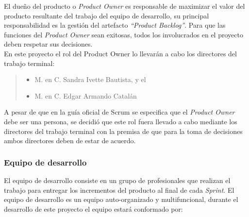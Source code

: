  El dueño del producto o {\em Product Owner} es responsable de maximizar el valor del producto
 resultante del trabajo del equipo de desarrollo, su principal responsabilidad es la gestión
 del artefacto {\em``Product Backlog''}. Para que las funciones del {\it Product Owner} sean exitosas,
 todos los involucrados en el proyecto deben respetar sus decisiones.\\

 \noindent En este proyecto el rol del Product Owner lo llevarán a cabo los directores del trabajo terminal:
     
    \begin{quote}
    \begin{itemize}
        \item M. en C. Sandra Ivette Bautista, y el
        \item M. en C. Edgar Armando Catalán
    \end{itemize}
    \end{quote}
                                         
 \noindent A pesar de que en la guía oficial de Scrum \cite{TheScrumGuide} se especifica que el {\it Product
 Owner} debe ser una persona, se decidió que este rol fuera llevado a cabo mediante los directores del trabajo
 terminal con la premisa de que para la toma de decisiones ambos directores deben de estar de acuerdo.

\subsubsection{Equipo de desarrollo}

 El equipo de desarrollo consiste en un grupo de profesionales que realizan el trabajo para entregar
 los incrementos del producto al final de cada {\it Sprint}. El equipo de desarrollo es un equipo
 auto-organizado y multifuncional, durante el desarrollo de este proyecto el equipo estará conformado por:


